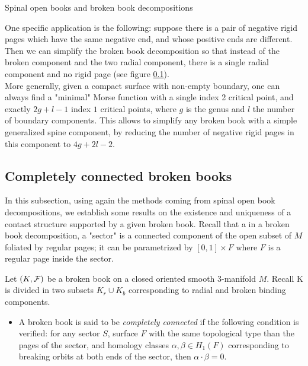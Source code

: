 \documentclass[../main.tex]{subfiles}
\begin{document}
\begin{section}{Spinal open books and broken book decompositions}
\begin{remark}
One specific application is the following: suppose there is a pair of negative rigid pages which have the same negative end, and whose positive ends are different. Then we can simplify the broken book decomposition so that instead of the broken component and the two radial component, there is a single radial component and no rigid page (see figure \ref{}).\\
More generally, given a compact surface with non-empty boundary, one can always find a "minimal" Morse function with a single index 2 critical point, and exactly $2g + l-1$ index $1$ critical points, where $g$ is the genus and $l$ the number of boundary components. This allows to simplify any broken book with a simple generalized spine component, by reducing the number of negative rigid pages in this component to $4g + 2l-2$.
\end{remark}











\subsection{Completely connected broken books}

In this subsection, using again the methods coming from spinal open book decompositions, we establish some results on the existence and uniqueness of a contact structure supported by a given broken book. Recall that a in a broken book decomposition, a "sector" is a connected component of the open subset of $M$ foliated by regular pages; it can be parametrized by $[0,1]\times F$ where $F$ is a regular page inside the sector.

\begin{definition}
Let $(K,\mathcal{F})$ be a broken book on a closed oriented smooth $3$-manifold $M$. Recall K is divided in two subsets $K_r\cup K_b$ corresponding to radial and broken binding components. 

\begin{itemize}
    \item A broken book is said to be \textit{completely connected} if the following condition is verified: for any sector $S$, surface $F$ with the same topological type than the pages of the sector, and homology classes $\alpha,\beta \in H_1(F)$ corresponding to breaking orbits at both ends of the sector, then $\alpha\cdot \beta = 0$.


\end{itemize}
\end{definition}
\end{section}
\end{document}
